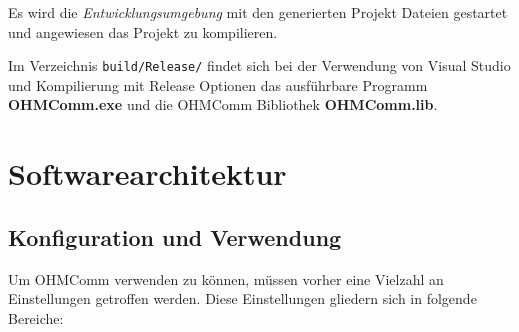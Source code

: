 Es wird die \textit{Entwicklungsumgebung} mit den generierten Projekt Dateien gestartet und angewiesen das Projekt zu kompilieren.

Im Verzeichnis \texttt{build/Release/} findet sich bei der Verwendung von Visual Studio und Kompilierung mit Release Optionen das ausführbare Programm \textbf{OHMComm.exe} und die OHMComm Bibliothek \textbf{OHMComm.lib}.

\section{Softwarearchitektur}
\subsection{Konfiguration und Verwendung}
\label{configurationUsages}
Um OHMComm verwenden zu können, müssen vorher eine Vielzahl an Einstellungen getroffen werden. Diese Einstellungen gliedern sich in folgende Bereiche:
